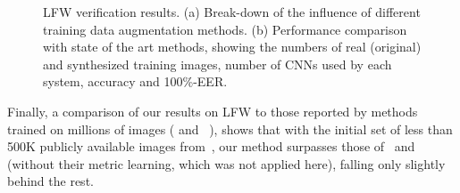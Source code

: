 \documentclass[runningheads]{llncs}
\begin{document}
\begin{figure}[t]
\centering
{}
\caption{LFW verification results. (a) Break-down of the influence of different training data augmentation methods. (b)  Performance comparison with state of the art methods, showing the numbers of real (original) and synthesized training images, number of CNNs used by each system, accuracy and 100\%-EER.}
\label{fig:lfw}
\vspace{-3mm}
\end{figure}



Finally, a comparison of our results on LFW to those reported by methods trained on millions of images (\cite{taigman2014deepface,Taigman_2015_CVPR,parkhi2015deep} and ~\cite{schroff2015facenet}), shows that with the initial set of less than 500K publicly available images from~\cite{yi2014learning}, our method surpasses those of~\cite{taigman2014deepface} and~\cite{parkhi2015deep} (without their metric learning, which was not applied here), falling only slightly behind the rest.
\end{document}
